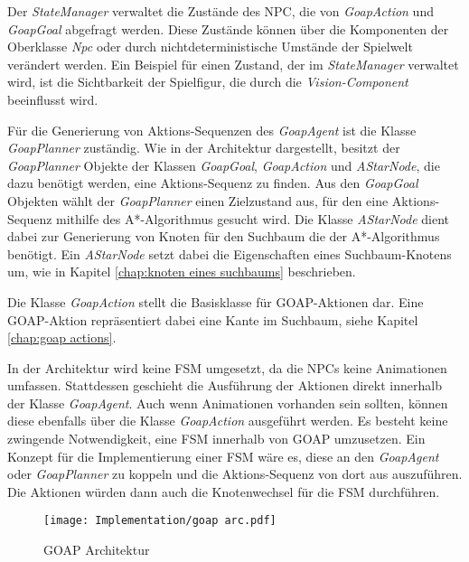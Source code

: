 Der \textit{StateManager} verwaltet die Zustände des NPC, die von \textit{GoapAction} und \textit{GoapGoal} abgefragt werden. Diese Zustände können über die Komponenten der Oberklasse \textit{Npc} oder durch nichtdeterministische Umstände der Spielwelt verändert werden. Ein Beispiel für einen Zustand, der im \textit{StateManager} verwaltet wird, ist die Sichtbarkeit der Spielfigur, die durch die \textit{Vision-Component} beeinflusst wird.

Für die Generierung von Aktions-Sequenzen des \textit{GoapAgent} ist die Klasse \textit{GoapPlanner} zuständig. Wie in der Architektur dargestellt, besitzt der \textit{GoapPlanner} Objekte der Klassen \textit{GoapGoal}, \textit{GoapAction} und \textit{AStarNode}, die dazu benötigt werden, eine Aktions-Sequenz zu finden. Aus den \textit{GoapGoal} Objekten wählt der \textit{GoapPlanner} einen Zielzustand aus, für den eine Aktions-Sequenz mithilfe des A*-Algorithmus gesucht wird. Die Klasse \textit{AStarNode} dient dabei zur Generierung von Knoten für den Suchbaum die der A*-Algorithmus benötigt. Ein \textit{AStarNode} setzt dabei die Eigenschaften eines Suchbaum-Knotens um, wie in Kapitel \ref{chap:knoten eines suchbaums} beschrieben.

Die Klasse \textit{GoapAction} stellt die Basisklasse für GOAP-Aktionen dar. Eine GOAP-Aktion repräsentiert dabei eine Kante im Suchbaum, siehe Kapitel \ref{chap:goap actions}.

In der Architektur wird keine FSM umgesetzt, da die NPCs keine Animationen umfassen. Stattdessen geschieht die Ausführung der Aktionen direkt innerhalb der Klasse \textit{GoapAgent}. Auch wenn Animationen vorhanden sein sollten, können diese ebenfalls über die Klasse \textit{GoapAction} ausgeführt werden. Es besteht keine zwingende Notwendigkeit, eine FSM innerhalb von GOAP umzusetzen. Ein Konzept für die Implementierung einer FSM wäre es, diese an den \textit{GoapAgent} oder \textit{GoapPlanner} zu koppeln und die Aktions-Sequenz von dort aus auszuführen. Die Aktionen würden dann auch die Knotenwechsel für die FSM durchführen.

\begin{figure}[h]
  \centering
  \texttt{[image: Implementation/goap arc.pdf]}
	\captionsetup{justification=justified, format=plain}
  \caption{GOAP Architektur}
  \label{fig:GOAP Architektur}
\end{figure}







